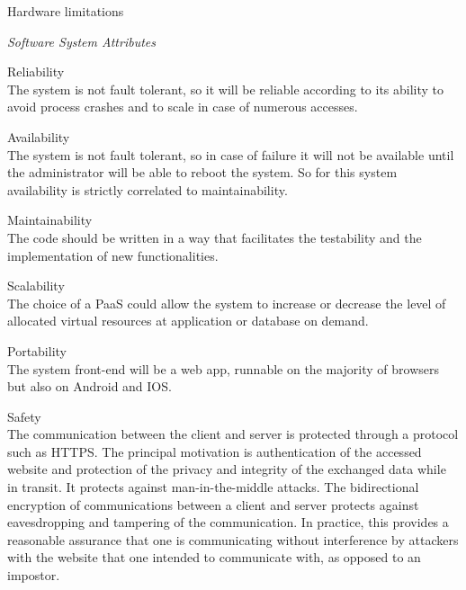 \documentclass{article}
\begin{document}
\begin{legal}
\begin{legal}
\begin{legal}
			\item Hardware limitations\\
			\end{legal}
    		\item \textit{Software System Attributes }\\
		\begin{legal}\bfseries
			\item Reliability\\
			{\normalfont The system is not fault tolerant, so it will be reliable according to its ability to avoid process crashes and to scale in case of numerous accesses.}
			\\
			\item Availability\\
			{\normalfont The system is not fault tolerant, so in case of failure it will not be available until the administrator will be able to reboot the system. So for this system availability is strictly correlated to maintainability.}
			\\
			\item Maintainability\\
			{\normalfont The code should be written in a way that facilitates the testability and the implementation of new functionalities.}
			\\
			\item Scalability\\
			{\normalfont The choice of a PaaS could allow the system to increase or decrease the level of allocated virtual resources at application or database on demand.}
			\\
			\item Portability\\
			{\normalfont The system front-end will be a web app, runnable on the majority of browsers but also on Android and IOS.}
			\\
			\item Safety\\
			{\normalfont The communication between the client and server is protected through a protocol such as HTTPS. The principal motivation is authentication of the accessed website and protection of the privacy and integrity of the exchanged data while in transit. It protects against man-in-the-middle attacks. The bidirectional encryption of communications between a client and server protects against eavesdropping and tampering of the communication. In practice, this provides a reasonable assurance that one is communicating without interference by attackers with the website that one intended to communicate with, as opposed to an impostor. 			}

\end{legal}
\end{legal}
\end{legal}
\end{document}
